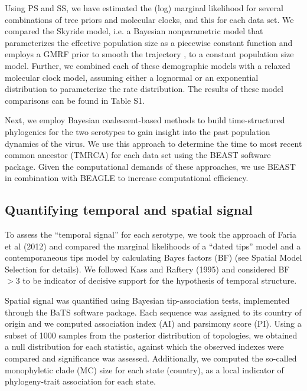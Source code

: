 \documentclass[10pt]{article}
\begin{document}

Using PS and SS, we have estimated the (log) marginal likelihood for several combinations of tree priors and molecular clocks, and this for each data set.
We compared the Skyride model, i.e. a Bayesian nonparametric model that parameterizes the effective population size as a piecewise constant function and employs a GMRF prior to smooth the trajectory \cite{skygrid}, to a constant population size model.
Further, we combined each of these demographic models with a relaxed molecular clock model, assuming either a lognormal or an exponential distribution to parameterize the rate distribution.
The results of these model comparisons can be found in Table S1.

Next, we employ Bayesian coalescent-based methods to build time-structured phylogenies for the two serotypes to gain insight into the past population dynamics of the virus.
We use this approach to determine the time to most recent common ancestor (TMRCA) for each data set using the BEAST \cite{BEAST} software package.
 Given the computational demands of these approaches, we use BEAST \cite{BEAST} in combination with BEAGLE \cite{BEAGLE} to increase computational efficiency.


\subsection*{Quantifying temporal and spatial signal} 

To assess the ``temporal signal'' for each serotype, we took the approach of Faria et al (2012) \cite{Faria2012} and compared the marginal likelihoods of a ``dated tips'' model and a contemporaneous tips model by calculating Bayes factors (BF) \cite{Suchard2001,KassRaftery1995} (see Spatial Model Selection for details).
We followed Kass and Raftery (1995) \cite{KassRaftery1995} and considered BF$>3$ to be indicator of decisive support for the hypothesis of temporal structure.

Spatial signal was quantified using Bayesian tip-association tests, implemented through the BaTS software package\cite{bats}.
Each sequence was assigned to its country of origin and we computed association index (AI) and parsimony score (PI).
Using a subset of 1000 samples from the posterior distribution of topologies, we obtained a null distribution for each statistic, against which the observed indexes were compared and significance was assessed.
Additionally, we computed the so-called monophyletic clade (MC) size for each state (country), as a local indicator of phylogeny-trait association for each state.
\end{document}
